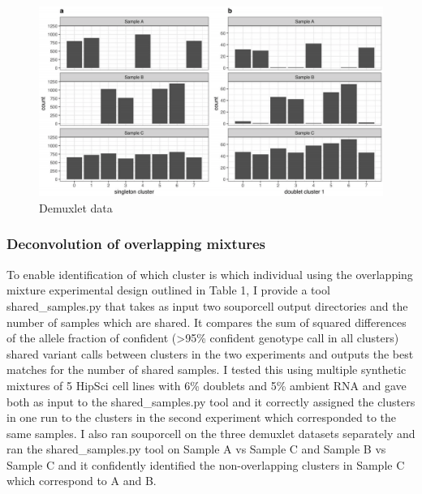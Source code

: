 \begin{figure}[htbp!]
\caption{Demuxlet data}
\label{figure:demuxlet}
\begin{centering}
\includegraphics[width=\textwidth]{demuxletdata.png} 
\end{centering}

\end{figure}

\subsubsection{Deconvolution of overlapping mixtures}

\par{
To enable identification of which cluster is which individual using the overlapping mixture experimental
design outlined in Table 1, I provide a tool shared\_samples.py that takes as input two souporcell
output directories and the number of samples which are shared. It compares the sum of squared
differences of the allele fraction of confident (>95\% confident genotype call in all clusters) shared variant
calls between clusters in the two experiments and outputs the best matches for the number of shared
samples. I tested this using multiple synthetic mixtures of 5 HipSci
cell lines with 6\% doublets and 5\% ambient RNA and gave both as input to the shared\_samples.py tool
and it correctly assigned the clusters in one run to the clusters in the second experiment which
corresponded to the same samples. I also ran souporcell on the three demuxlet datasets separately and
ran the shared\_samples.py tool on Sample A vs Sample C and Sample B vs Sample C and it confidently
identified the non-overlapping clusters in Sample C which correspond to A and B. 
}



